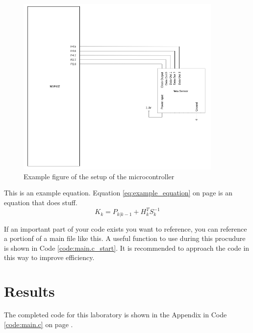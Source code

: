 \begin{center}
    \begin{figure}[h!]
        \centering
        \includegraphics[width=0.9\textwidth]{images/MSP432_Blackbox_Communication.png}
        \caption{Example figure of the setup of the microcontroller}
        \label{fig:example_setup} 
    \end{figure}
\end{center} 

This is an example equation.  Equation \ref{eq:example_equation} on page \pageref{eq:example_equation} is an equation that does stuff.\\
\begin{equation}\label{eq:example_equation}
    K_{k}=P_{k|k-1}+H_k^TS_k^{-1}
\end{equation}

If an important part of your code exists you want to reference, you can reference a portionf of a main file like this.  A useful function to use during this procudure is shown in Code \ref{code:main.c_start}.  It is recommended to approach the code in this way to improve efficiency.\\





\section{Results}
The completed code for this laboratory is shown in the Appendix in Code \ref{code:main.c} on page \pageref{code:main.c}.\\

